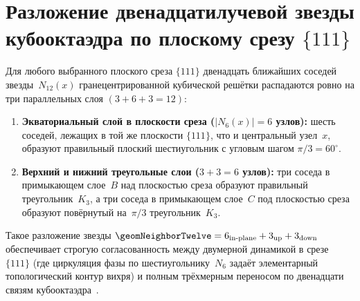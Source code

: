 \section{Разложение двенадцатилучевой звезды кубооктаэдра по плоскому срезу $\{111\}$}

Для любого выбранного плоского среза $\{111\}$ двенадцать ближайших соседей звезды~$N_{12}(x)$ гранецентрированной кубической решётки распадаются ровно на три параллельных слоя $(3 + 6 + 3 = 12)$:
\begin{enumerate}[noitemsep]
\item \textbf{Экваториальный слой в плоскости среза ($|N_6(x)| = 6$ узлов):}
  шесть соседей, лежащих в той же плоскости $\{111\}$, что и центральный узел~$x$, образуют правильный плоский шестиугольник с угловым шагом $\pi/3 = 60^\circ$.
\item \textbf{Верхний и нижний треугольные слои ($3 + 3 = 6$ узлов):}
  три соседа в примыкающем слое~$B$ над плоскостью среза образуют правильный треугольник~$K_3$, а три соседа в примыкающем слое~$C$ под плоскостью среза образуют повёрнутый на~$\pi/3$ треугольник~$K_3$.
\end{enumerate}

Такое разложение звезды $\geomNeighborTwelve = 6_{\mathrm{in\text{-}plane}} + 3_{\mathrm{up}} + 3_{\mathrm{down}}$ обеспечивает строгую согласованность между двумерной динамикой в срезе $\{111\}$ (где циркуляция фазы по шестиугольнику~$N_6$ задаёт элементарный топологический контур вихря) и полным трёхмерным переносом по двенадцати связям кубооктаэдра~\latGCKshort.
